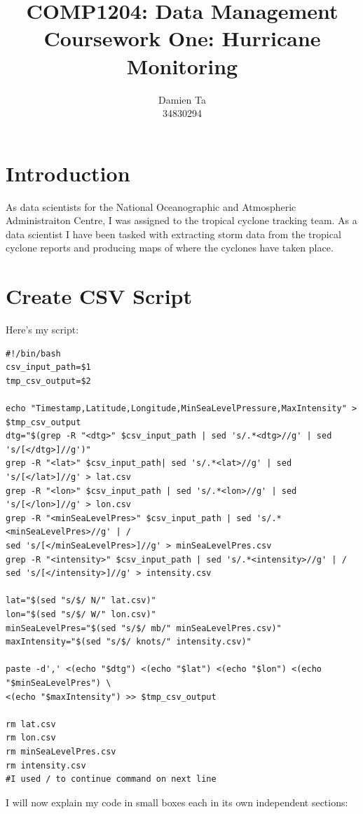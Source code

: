\documentclass[]{article}
\title{COMP1204: Data Management \\ Coursework One: Hurricane Monitoring }
\author{Damien Ta \\ 34830294}
\begin{document}
\maketitle

\section{Introduction}
As data scientists for the National Oceanographic and Atmospheric Administraiton Centre, I was assigned to the tropical cyclone
tracking team. As a data scientist I have been tasked with extracting storm data from the tropical cyclone reports and producing
maps of where the cyclones have taken place.
\section{Create CSV Script}
Here's my script:
\begin{tcolorbox}[colback=white, colframe=black, boxrule=0.5pt, arc=2mm, 
    title=create\_csv.sh, width=6.7in, fonttitle=\bfseries, listing only, listing options={language=sh, basicstyle=\ttfamily}]
    \begin{verbatim}
#!/bin/bash
csv_input_path=$1
tmp_csv_output=$2

echo "Timestamp,Latitude,Longitude,MinSeaLevelPressure,MaxIntensity" > $tmp_csv_output
dtg="$(grep -R "<dtg>" $csv_input_path | sed 's/.*<dtg>//g' | sed 's/[</dtg>]//g')"
grep -R "<lat>" $csv_input_path| sed 's/.*<lat>//g' | sed 's/[</lat>]//g' > lat.csv
grep -R "<lon>" $csv_input_path | sed 's/.*<lon>//g' | sed 's/[</lon>]//g' > lon.csv
grep -R "<minSeaLevelPres>" $csv_input_path | sed 's/.*<minSeaLevelPres>//g' | /
sed 's/[</minSeaLevelPres>]//g' > minSeaLevelPres.csv
grep -R "<intensity>" $csv_input_path | sed 's/.*<intensity>//g' | / 
sed 's/[</intensity>]//g' > intensity.csv

lat="$(sed "s/$/ N/" lat.csv)"
lon="$(sed "s/$/ W/" lon.csv)"
minSeaLevelPres="$(sed "s/$/ mb/" minSeaLevelPres.csv)"
maxIntensity="$(sed "s/$/ knots/" intensity.csv)"

paste -d',' <(echo "$dtg") <(echo "$lat") <(echo "$lon") <(echo "$minSeaLevelPres") \
<(echo "$maxIntensity") >> $tmp_csv_output

rm lat.csv
rm lon.csv
rm minSeaLevelPres.csv
rm intensity.csv
#I used / to continue command on next line
    \end{verbatim}
\end{tcolorbox}
I will now explain my code in small boxes each in its own independent sections:
\end{document}
